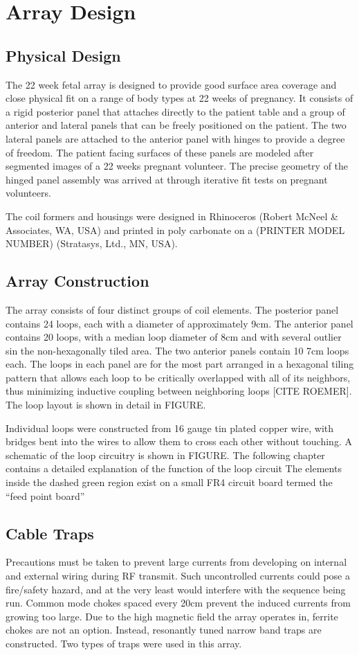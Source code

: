 \chapter{Array Design}
\section{Physical Design}
The 22 week fetal array is designed to provide good surface area coverage and close physical fit on a range of body
types at 22 weeks of pregnancy.  It consists of a rigid posterior panel that attaches directly to the patient table and
a group of anterior and lateral panels that can be freely positioned on the patient. The two lateral panels are attached
to the anterior panel with hinges to provide a degree of freedom. The patient facing surfaces of these panels are
modeled after segmented images of a 22 weeks pregnant volunteer. The precise geometry of the hinged panel assembly was
arrived at through iterative fit tests on pregnant volunteers.
  
The coil formers and housings were designed in Rhinoceros (Robert McNeel \& Associates, WA, USA) and printed in
poly carbonate on a (PRINTER MODEL NUMBER) (Stratasys, Ltd., MN, USA).

\section{Array Construction}
The array consists of four distinct groups of coil elements. The posterior panel contains 24 loops, each with a diameter
of approximately 9cm. The anterior panel contains 20 loops, with a median loop diameter of 8cm and with several
outlier sin the non-hexagonally tiled area. The two anterior panels contain 10 7cm loops each. The loops in each panel
are for the most part arranged in a hexagonal tiling pattern that allows each loop to be critically overlapped with all
of its neighbors,  thus minimizing inductive coupling between neighboring loops [CITE ROEMER]. The loop layout is shown
in detail in FIGURE.

Individual loops were constructed from 16 gauge tin plated copper wire, with bridges bent into the wires to allow them
to cross each other without touching. A schematic of the loop circuitry is shown in FIGURE. The following chapter
contains a detailed explanation of the function of the loop circuit The elements inside the dashed green region exist on
a small FR4 circuit board termed the “feed point board” 

\section{Cable Traps}
Precautions must be taken to prevent large currents from developing on internal and external wiring during RF
transmit. Such uncontrolled currents could pose a fire/safety hazard, and at the very least would interfere with the
sequence being run. Common mode chokes spaced every 20cm prevent the induced currents from growing too large. Due to
the high magnetic field the array operates in, ferrite chokes are not an option. Instead, resonantly tuned narrow band
traps are constructed. Two types of traps were used in this array.

